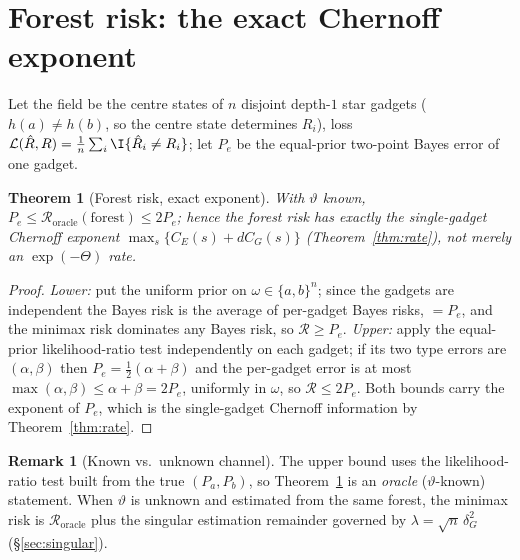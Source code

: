 \documentclass[11pt]{article}
\theoremstyle{plain}
\newtheorem{theorem}{Theorem}\newtheorem{proposition}{Proposition}\newtheorem{corollary}{Corollary}
\theoremstyle{definition}\newtheorem{assumption}{Assumption}\newtheorem{remark}{Remark}
\begin{document}
\section{Forest risk: the exact Chernoff exponent}\label{sec:forest}
Let the field be the centre states of $n$ disjoint depth-$1$ star gadgets ($h(a)\neq h(b)$, so the centre state
determines $R_i$), loss $\mathcal L(\hat R,R)=\frac1n\sum_i\I\{\hat R_i\neq R_i\}$; let $P_e$ be the equal-prior
two-point Bayes error of one gadget.
\begin{theorem}[Forest risk, exact exponent]\label{thm:forest}
With $\vartheta$ known, $P_e\le\mathcal R_{\mathrm{oracle}}(\mathrm{forest})\le 2P_e$; hence the forest risk has
\emph{exactly} the single-gadget Chernoff exponent $\max_s\{C_E(s)+dC_G(s)\}$ (Theorem~\ref{thm:rate}), not merely
an $\exp(-\Theta)$ rate.
\end{theorem}
\begin{proof}
\emph{Lower:} put the uniform prior on $\omega\in\{a,b\}^n$; since the gadgets are independent the Bayes risk is
the average of per-gadget Bayes risks, $=P_e$, and the minimax risk dominates any Bayes risk, so
$\mathcal R\ge P_e$. \emph{Upper:} apply the equal-prior likelihood-ratio test independently on each gadget; if its
two type errors are $(\alpha,\beta)$ then $P_e=\tfrac12(\alpha+\beta)$ and the per-gadget error is at most
$\max(\alpha,\beta)\le\alpha+\beta=2P_e$, uniformly in $\omega$, so $\mathcal R\le 2P_e$. Both bounds carry the
exponent of $P_e$, which is the single-gadget Chernoff information by Theorem~\ref{thm:rate}.
\end{proof}
\begin{remark}[Known vs.\ unknown channel]
The upper bound uses the likelihood-ratio test built from the true $(P_a,P_b)$, so Theorem~\ref{thm:forest} is an
\emph{oracle} ($\vartheta$-known) statement. When $\vartheta$ is unknown and estimated from the same forest, the
minimax risk is $\mathcal R_{\mathrm{oracle}}$ plus the singular estimation remainder governed by
$\lambda=\sqrt n\,\delta_G^2$ (\S\ref{sec:singular}).
\end{remark}
\end{document}
